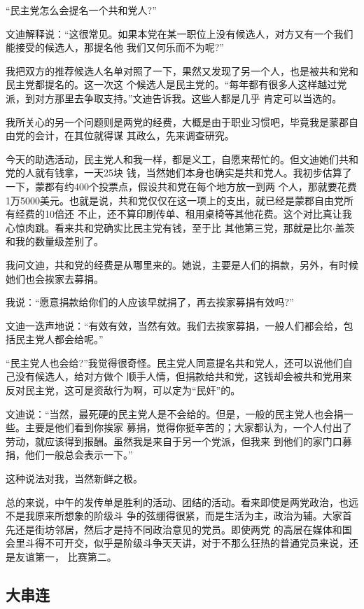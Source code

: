 ﻿\documentclass[11pt]{article}
\begin{document}
``民主党怎么会提名一个共和党人?''

文迪解释说：``这很常见。如果本党在某一职位上没有候选人，对方又有一个我们能接受的候选人，那提名他
我们又何乐而不为呢?''

我把双方的推荐候选人名单对照了一下，果然又发现了另一个人，也是被共和党和民主党都提名的。这一次这
个候选人是民主党的。``每年都有很多人这样越过党派，到对方那里去争取支持。''文迪告诉我。这些人都是几乎
肯定可以当选的。

我所关心的另一个问题则是两党的经费，大概是由于职业习惯吧，毕竟我是蒙郡自由党的会计，在其位就得谋
其政么，先来调查研究。

今天的助选活动，民主党人和我一样，都是义工，自愿来帮忙的。但文迪她们共和党的人就有钱拿，一天25块
钱，当然她们本身也确实是共和党人。我初步估算了一下，蒙郡有约400个投票点，假设共和党在每个地方放一到两
个人，那就要花费1万5000美元。也就是说，共和党仅仅在这一项上的支出，就已经是蒙郡自由党所有经费的10倍还
不止，还不算印刷传单、租用桌椅等其他花费。这个对比真让我心惊肉跳。看来共和党确实比民主党有钱，至于比
其他第三党，那就是比尔$\cdot$盖茨和我的数量级差别了。

我问文迪，共和党的经费是从哪里来的。她说，主要是人们的捐款，另外，有时候她们也会挨家去募捐。

我说：``愿意捐款给你们的人应该早就捐了，再去挨家募捐有效吗?''

文迪一迭声地说：``有效有效，当然有效。我们去挨家募捐，一般人们都会给，包括民主党人都会给呢。''

``民主党人也会给?''我觉得很奇怪。民主党人同意提名共和党人，还可以说他们自己没有候选人，给对方做个
顺手人情，但捐款给共和党，这钱却会被共和党用来反对民主党，这可是资敌行为啊，可以定为``民奸''的。

文迪说：``当然，最死硬的民主党人是不会给的。但是，一般的民主党人也会捐一些。主要是他们看到你挨家
募捐，觉得你挺辛苦的；大家都认为，一个人付出了劳动，就应该得到报酬。虽然我是来自于另一个党派，但我来
到他们的家门口募捐，他们一般总会表示一下。''

这种说法对我，当然新鲜之极。

总的来说，中午的发传单是胜利的活动、团结的活动。看来即使是两党政治，也远不是我原来所想象的阶级斗
争的弦绷得很紧，而是生活为主，政治为辅。大家首先还是街坊邻居，然后才是持不同政治意见的党员。即使两党
的高层在媒体和国会里斗得不可开交，似乎是阶级斗争天天讲，对于不那么狂热的普通党员来说，还是友谊第一，
比赛第二。

\subsection{大串连}
\end{document}
